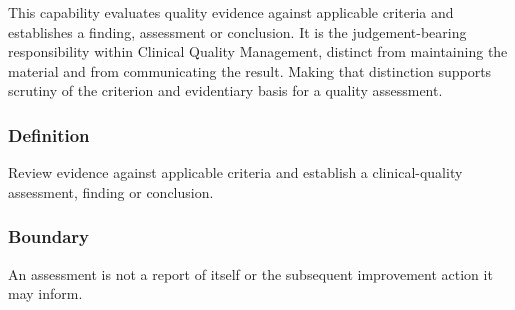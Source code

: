 This capability evaluates quality evidence against applicable criteria and establishes a finding, assessment or conclusion. It is the judgement-bearing responsibility within Clinical Quality Management, distinct from maintaining the material and from communicating the result. Making that distinction supports scrutiny of the criterion and evidentiary basis for a quality assessment.

\subsubsection*{Definition}

Review evidence against applicable criteria and establish a clinical-quality assessment, finding or conclusion.

\subsubsection*{Boundary}

An assessment is not a report of itself or the subsequent improvement action it may inform.


